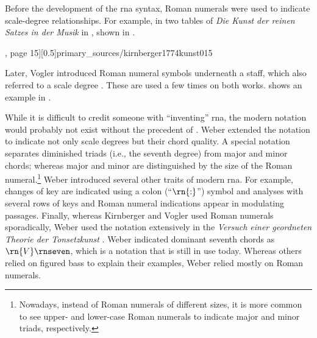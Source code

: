 



Before the development of the \gls{rna} syntax, Roman
numerals were used to indicate scale-degree relationships.
For example, in two tables of \emph{Die Kunst der reinen
Satzes in der Musik} in \textcite{kirnberger1774kunst},
shown in .

\phdfigure[Roman numerals in
\textcite[15]{kirnberger1774kunst}, page
15][0.5]{primary_sources/kirnberger1774kunst015}
 

Later, Vogler introduced Roman numeral symbols underneath a
staff, which also referred to a scale degree
\parencite{vogler1778grunde, vogler1802handbuch}. These are
used a few times on both works.
 shows an
example in \textcite{vogler1778grunde}.


While it is difficult to credit someone with ``inventing''
\gls{rna}, the modern notation would probably not exist
without the precedent of \textcite{weber1817versuch}. Weber
extended the notation to indicate not only scale degrees but
their chord quality. A special notation separates diminished
triads (i.e., the seventh degree) from major and minor
chords; whereas major and minor are distinguished by the
size of the Roman numeral.\footnote{Nowadays, instead of
Roman numerals of different sizes, it is more common to see
upper- and lower-case Roman numerals to indicate major and
minor triads, respectively.} Weber introduced several other
traits of modern \gls{rna}. For example, changes of key are
indicated using a colon (``$\rn{:}$'') symbol and analyses
with several rows of keys and Roman numeral indications
appear in modulating passages. Finally, whereas Kirnberger
and Vogler used Roman numerals sporadically, Weber used the
notation extensively in the
\emph{Versuch einer geordneten Theorie der Tonsetzkunst}
\parencite{weber1817versuch}. Weber indicated dominant
seventh chords as $\rn{V}\rnseven$, which is a notation that
is still in use today. Whereas others relied on figured bass
to explain their examples, Weber relied mostly on Roman
numerals.
